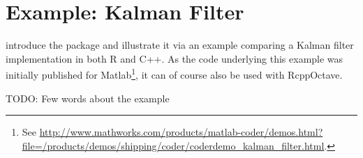 

\section{Example: Kalman Filter}

\cite{Eddelbuettel+Sanderson:2013} introduce the  package
and illustrate it via an example comparing a Kalman filter implementation in both R and
C++. As the code underlying this example was initially published for
Matlab\footnote{See
  \url{http://www.mathworks.com/products/matlab-coder/demos.html?file=/products/demos/shipping/coder/coderdemo_kalman_filter.html}.},
it can of course also be used with RcppOctave.

TODO: Few words about the example

